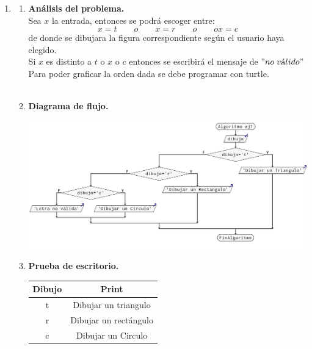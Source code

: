 \begin{enumerate}

\item 

\begin{enumerate}[\bfseries a)]
    
    \item \textbf{Análisis del problema.}\\
	
	Sea $x$ la entrada, entonces se podrá escoger entre:
	$$x=t \qquad o \qquad x=r \qquad o \qquad o x=c$$
	de donde se dibujara la figura correspondiente según el usuario haya elegido.\\
	Si $x$ es distinto a $t$ o $x$ o $c$ entonces se escribirá el mensaje de $"no\; v\mbox{á}lido"$
	Para poder graficar la orden dada se debe programar con turtle.\\\\

    \item \textbf{Diagrama de flujo.}\\
	\begin{center}
	    \includegraphics[scale=.37]{imagenes/tarea4/ej1.png}
	\end{center}

    \item \textbf{Prueba de escritorio.}\\
	\begin{center}
	    \begin{tabular}{c|c}
		Dibujo&Print\\
		\hline
		t&Dibujar un triangulo\\
		\hline
		r&Dibujar un rectángulo\\
		\hline
		c&Dibujar un Circulo\\
	    \end{tabular}
	\end{center}
	\vspace{4cm}
    

\end{enumerate}
\end{enumerate}
